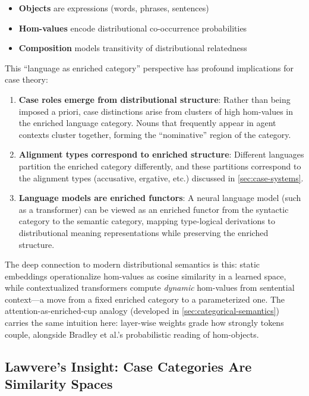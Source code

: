 \documentclass[
]{article}
\providecommand{\tightlist}{%
  \setlength{\itemsep}{0pt}\setlength{\parskip}{0pt}}
\begin{document}
\begin{itemize}
\tightlist
\item
  \textbf{Objects} are expressions (words, phrases, sentences)
\item
  \textbf{Hom-values} encode distributional co-occurrence probabilities
\item
  \textbf{Composition} models transitivity of distributional relatedness
\end{itemize}

This ``language as enriched category'' perspective has profound
implications for case theory:

\begin{enumerate}
\def\labelenumi{\arabic{enumi}.}
\item
  \textbf{Case roles emerge from distributional structure}: Rather than
  being imposed a priori, case distinctions arise from clusters of high
  hom-values in the enriched language category. Nouns that frequently
  appear in agent contexts cluster together, forming the ``nominative''
  region of the category.
\item
  \textbf{Alignment types correspond to enriched structure}: Different
  languages partition the enriched category differently, and these
  partitions correspond to the alignment types (accusative, ergative,
  etc.) discussed in \autoref{sec:case-systems}.
\item
  \textbf{Language models are enriched functors}: A neural language
  model (such as a transformer) can be viewed as an enriched functor
  from the syntactic category to the semantic category, mapping
  type-logical derivations to distributional meaning representations
  while preserving the enriched structure.
\end{enumerate}

The deep connection to modern distributional semantics is this: static
embeddings operationalize hom-values as cosine similarity in a learned
space, while contextualized transformers
\citep{devlin2019bert, vaswani2017attention} compute \emph{dynamic}
hom-values from sentential context---a move from a fixed enriched
category to a parameterized one. The attention-as-enriched-cup analogy
(developed in \autoref{sec:categorical-semantics}) carries the same
intuition here: layer-wise weights grade how strongly tokens couple,
alongside Bradley et al.'s \citeyearpar{fritz2021enriched} probabilistic
reading of hom-objects.

\subsection{Lawvere's Insight: Case Categories Are Similarity
Spaces}\label{lawveres-insight-case-categories-are-similarity-spaces}
\end{document}
